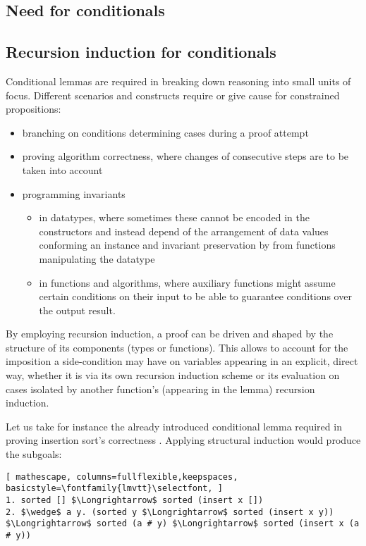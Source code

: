\label{sec:conditionals}

\subsection{Need for conditionals}
\subsection{Recursion induction for conditionals}

Conditional lemmas are required in breaking down reasoning into small units of focus.
%
Different scenarios and constructs require or give cause for constrained propositions:

\begin{itemize}
\item branching on conditions determining cases during a proof attempt
\item proving algorithm correctness, where changes of consecutive steps are to be taken into account
\item programming invariants
\begin{itemize}
\item in datatypes, where sometimes these cannot be encoded in the constructors and instead depend of the arrangement of data values conforming an instance and invariant preservation by from functions manipulating the datatype
\item in functions and algorithms, where auxiliary functions might assume certain conditions on their input to be able to guarantee conditions over the output result.
\end{itemize}
\end{itemize}

By employing recursion induction, a proof can be driven and shaped by the structure of its components (types or functions).
%
This allows to account for the imposition a side-condition may have on variables appearing in an explicit, direct way, whether it is via its own recursion induction scheme or its evaluation on cases isolated by another function's (appearing in the lemma) recursion induction.


Let us take for instance the already introduced conditional lemma required in proving insertion sort's correctness .
%
Applying structural induction would produce the subgoals:

\begin{lstlisting}[ mathescape, columns=fullflexible,keepspaces, basicstyle=\fontfamily{lmvtt}\selectfont, ]
1. sorted [] $\Longrightarrow$ sorted (insert x [])
2. $\wedge$ a y. (sorted y $\Longrightarrow$ sorted (insert x y)) $\Longrightarrow$ sorted (a # y) $\Longrightarrow$ sorted (insert x (a # y))
\end{lstlisting}

